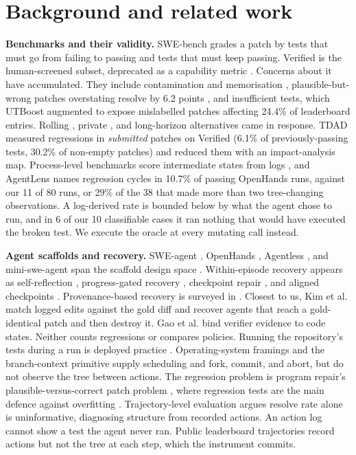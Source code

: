 \documentclass{article}
\begin{document}
\section{Background and related work}

\textbf{Benchmarks and their validity.} SWE-bench \cite{ref1} grades a patch by tests that must go from failing to passing and tests that must keep passing. Verified \cite{ref2} is the human-screened subset, deprecated as a capability metric \cite{ref45}. Concerns about it have accumulated. They include contamination and memorisation \cite{ref6}, plausible-but-wrong patches overstating resolve by 6.2 points \cite{ref36}, and insufficient tests, which UTBoost \cite{ref7} augmented to expose mislabelled patches affecting 24.4\% of leaderboard entries. Rolling \cite{ref3,ref5}, private \cite{ref4}, and long-horizon \cite{ref23} alternatives came in response. TDAD \cite{ref8} measured regressions in \emph{submitted} patches on Verified (6.1\% of previously-passing tests, 30.2\% of non-empty patches) and reduced them with an impact-analysis map. Process-level benchmarks score intermediate states from logs \cite{ref34,ref35}, and AgentLens \cite{ref37} names regression cycles in 10.7\% of passing OpenHands runs, against our 11 of 80 runs, or 29\% of the 38 that made more than two tree-changing observations. A log-derived rate is bounded below by what the agent chose to run, and in 6 of our 10 classifiable cases it ran nothing that would have executed the broken test. We execute the oracle at every mutating call instead.

\textbf{Agent scaffolds and recovery.} SWE-agent \cite{ref9}, OpenHands \cite{ref10}, Agentless \cite{ref11}, and mini-swe-agent \cite{ref12} span the scaffold design space \cite{ref13,ref14}. Within-episode recovery appears as self-reflection \cite{ref15,ref16}, progress-gated recovery \cite{ref17}, checkpoint repair \cite{ref18}, and aligned checkpoints \cite{ref40}. Provenance-based recovery is surveyed in \cite{ref19}. Closest to us, Kim et al. \cite{ref38} match logged edits against the gold diff and recover agents that reach a gold-identical patch and then destroy it. Gao et al. \cite{ref39} bind verifier evidence to code states. Neither counts regressions or compares policies. Running the repository's tests during a run is deployed practice \cite{ref42,ref43}. Operating-system framings \cite{ref20} and the branch-context primitive \cite{ref41} supply scheduling and fork, commit, and abort, but do not observe the tree between actions. The regression problem is program repair's plausible-versus-correct patch problem \cite{ref26,ref28,ref29}, where regression tests are the main defence against overfitting \cite{ref27}. Trajectory-level evaluation \cite{ref21,ref22} argues resolve rate alone is uninformative, diagnosing structure from recorded actions. An action log cannot show a test the agent never ran. Public leaderboard trajectories record actions but not the tree at each step, which the instrument commits.
\end{document}
